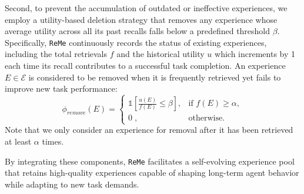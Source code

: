 \documentclass[11pt]{article}
\newcommand{\ours}{\texttt{ReMe}}
\begin{document}
Second, to prevent the accumulation of outdated or ineffective experiences, we employ a utility-based deletion strategy that removes any experience whose average utility across all its past recalls falls below a predefined threshold $\beta$. 
Specifically, {\ours} continuously records the status of existing experiences, including the total retrievals $f$ and the historical utility $u$ which increments by 1 each time its recall contributes to a successful task completion. 
An experience $E\in \mathcal{E}$ is considered to be removed when it is frequently retrieved yet fails to improve new task performance: 
\begin{equation}
\phi_{remove}(E) = 
\begin{cases}
\mathds{1} \left[\frac{u(E)}{f(E)}  \leq \beta\right], & \text{if }f(E)\geq \alpha, \\
0\;, & \text{otherwise}.
\end{cases}
\end{equation}
Note that we only consider an experience for removal after it has been retrieved at least $\alpha$ times. 

By integrating these components, {\ours} facilitates a self-evolving experience pool that retains high-quality experiences capable of shaping long-term agent behavior while adapting to new task demands. 
\end{document}
